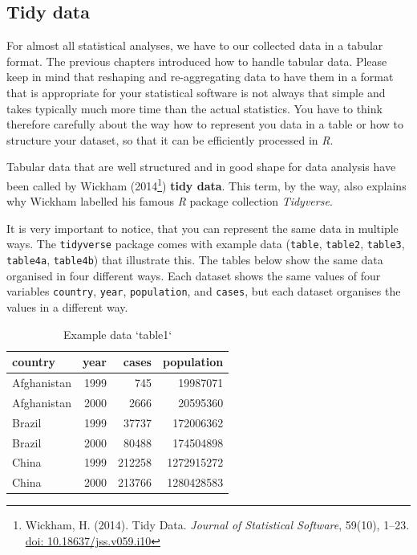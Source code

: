 \documentclass[
]{scrartcl}
\begin{document}
\hypertarget{tidy-data}{%
\subsection{Tidy data}\label{tidy-data}}

For almost all statistical analyses, we have to our collected data in a tabular format. The previous chapters introduced how to handle tabular data. Please keep in mind that reshaping and re-aggregating data to have them in a format that is appropriate for your statistical software is not always that simple and takes typically much more time than the actual statistics. You have to think therefore carefully about the way how to represent you data in a table or how to structure your dataset, so that it can be efficiently processed in \emph{R}.

Tabular data that are well structured and in good shape for data analysis have been called by Wickham (2014\footnote{Wickham, H. (2014). Tidy Data. \emph{Journal of Statistical Software}, 59(10), 1--23. \href{https://www.jstatsoft.org/v059/i10}{doi: 10.18637/jss.v059.i10}}) \textbf{tidy data}. This term, by the way, also explains why Wickham labelled his famous \emph{R} package collection \emph{Tidyverse}.

It is very important to notice, that you can represent the same data in multiple ways. The \texttt{tidyverse} package comes with example data (\texttt{table}, \texttt{table2}, \texttt{table3}, \texttt{table4a}, \texttt{table4b}) that illustrate this. The tables below show the same data organised in four different ways. Each dataset shows the same values of four variables \texttt{country}, \texttt{year}, \texttt{population}, and \texttt{cases}, but each dataset organises the values in a different way.

\begin{longtable}[t]{lrrr}
\caption{\label{tab:tab1}Example data `table1`}\\
\toprule
country & year & cases & population\\
\midrule
Afghanistan & 1999 & 745 & 19987071\\
Afghanistan & 2000 & 2666 & 20595360\\
Brazil & 1999 & 37737 & 172006362\\
Brazil & 2000 & 80488 & 174504898\\
China & 1999 & 212258 & 1272915272\\
\addlinespace
China & 2000 & 213766 & 1280428583\\
\bottomrule
\end{longtable}
\end{document}
